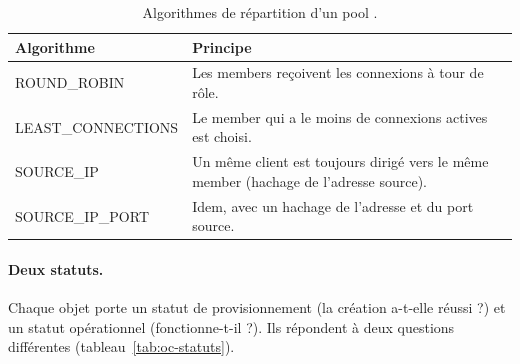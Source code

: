 \begin{table}[!ht]
\centering
\renewcommand{\arraystretch}{1.3}
\begin{tabular}{@{}>{\raggedright\arraybackslash\ttfamily\small}p{3.8cm}>{\raggedright\arraybackslash}p{11.7cm}@{}}
\toprule
\textrm{\textbf{Algorithme}} & \textbf{Principe} \\
\midrule
ROUND\_ROBIN & Les members reçoivent les connexions à tour de rôle. \\
LEAST\_CONNECTIONS & Le member qui a le moins de connexions actives est choisi. \\
SOURCE\_IP & Un même client est toujours dirigé vers le même member (hachage de l'adresse source). \\
SOURCE\_IP\_PORT & Idem, avec un hachage de l'adresse et du port source. \\
\bottomrule
\end{tabular}
\caption{Algorithmes de répartition d'un pool \parencite{octavia-api-ref}.}
\label{tab:oc-algos}
\end{table}

\paragraph{Deux statuts.} Chaque objet porte un statut de provisionnement (la création a-t-elle réussi ?) et un statut
opérationnel (fonctionne-t-il ?). Ils répondent à deux questions différentes (tableau~\ref{tab:oc-statuts}).


